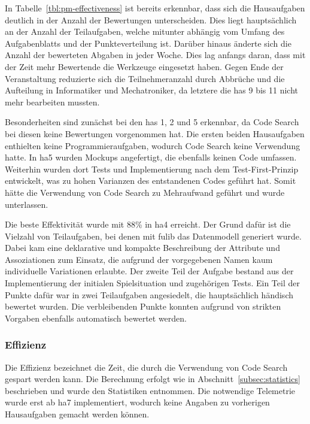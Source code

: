 In Tabelle~\ref{tbl:pm-effectiveness} ist bereits erkennbar, dass sich die Hausaufgaben deutlich in der Anzahl der Bewertungen unterscheiden.
Dies liegt hauptsächlich an der Anzahl der Teilaufgaben, welche mitunter abhängig vom Umfang des Aufgabenblatts und der Punkteverteilung ist.
Darüber hinaus änderte sich die Anzahl der bewerteten Abgaben in jeder Woche.
Dies lag anfangs daran, dass mit der Zeit mehr Bewertende die Werkzeuge eingesetzt haben.
Gegen Ende der Veranstaltung reduzierte sich die Teilnehmeranzahl durch Abbrüche und die Aufteilung in Informatiker und Mechatroniker, da letztere die \acp{ha} 9 bis 11 nicht mehr bearbeiten mussten.

Besonderheiten sind zunächst bei den \acp{ha} 1, 2 und 5 erkennbar, da Code Search bei diesen keine Bewertungen vorgenommen hat.
Die ersten beiden Hausaufgaben enthielten keine Programmieraufgaben, wodurch Code Search keine Verwendung hatte.
In \ac{ha}5 wurden Mockups angefertigt, die ebenfalls keinen Code umfassen.
Weiterhin wurden dort Tests und Implementierung nach dem Test-First-Prinzip entwickelt, was zu hohen Varianzen des entstandenen Codes geführt hat.
Somit hätte die Verwendung von Code Search zu Mehraufwand geführt und wurde unterlassen.

Die beste Effektivität wurde mit 88\% in \ac{ha}4 erreicht.
Der Grund dafür ist die Vielzahl von Teilaufgaben, bei denen mit fulib das Datenmodell generiert wurde.
Dabei kam eine deklarative und kompakte Beschreibung der Attribute und Assoziationen zum Einsatz, die aufgrund der vorgegebenen Namen kaum individuelle Variationen erlaubte.
Der zweite Teil der Aufgabe bestand aus der Implementierung der initialen Spielsituation und zugehörigen Tests.
Ein Teil der Punkte dafür war in zwei Teilaufgaben angesiedelt, die hauptsächlich händisch bewertet wurden.
Die verbleibenden Punkte konnten aufgrund von strikten Vorgaben ebenfalls automatisch bewertet werden.

\subsubsection{Effizienz}

Die Effizienz bezeichnet die Zeit, die durch die Verwendung von Code Search gespart werden kann.
Die Berechnung erfolgt wie in Abschnitt~\ref{subsec:statistics} beschrieben und wurde den Statistiken entnommen.
Die notwendige Telemetrie wurde erst ab \ac{ha}7 implementiert, wodurch keine Angaben zu vorherigen Hausaufgaben gemacht werden können.


